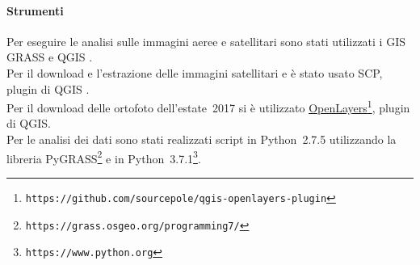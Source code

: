 \medskip
\paragraph{Strumenti}
Per eseguire le analisi sulle immagini aeree e satellitari sono stati utilizzati i GIS GRASS  e QGIS . 
\\
Per il download e l'estrazione delle immagini satellitari \AST{} e \Se{} è stato usato SCP, plugin di QGIS . 
\\
Per il download delle ortofoto dell'estate~2017 si è utilizzato \href{https://github.com/sourcepole/qgis-openlayers-plugin}{OpenLayers}\footnote{\texttt{https://github.com/sourcepole/qgis-openlayers-plugin}}, plugin di QGIS.
\\
Per le analisi dei dati sono stati realizzati script in Python~2.7.5 utilizzando la libreria PyGRASS\footnote{\texttt{https://grass.osgeo.org/programming7/}} e in Python~3.7.1\footnote{\texttt{https://www.python.org}}.
